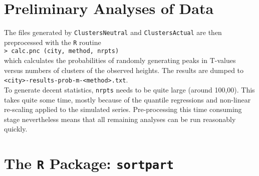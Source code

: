 \documentclass[a4paper,oneside]{article}
\begin{document}
\section{Preliminary Analyses of Data}

The files generated by {\tt ClustersNeutral} and {\tt ClustersActual} are then preprocessed with the {\tt R} routine\\
{\tt > calc.pnc (city, method, nrpts)}\\
which calculates the probabilities of randomly generating peaks in T-values versus numbers of clusters of the observed heights. The results are
dumped to\\
{\tt <city>-results-prob-m-<method>.txt}.\\
To generate decent statistics, {\tt nrpts} needs to be quite large (around 100,00). This takes quite some time, mostly because of the quantile
regressions and non-linear re-scaling applied to the simulated series.  Pre-processing this time consuming stage nevertheless means that all
remaining analyses can be run reasonably quickly.

\section{The {\tt R} Package: {\tt sortpart}}
\end{document}
